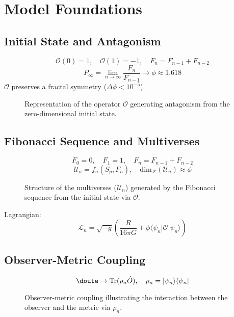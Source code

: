 \documentclass[aps,prl,twocolumn,groupedaddress]{revtex4-2}
\newcommand{\F}[1]{F_{#1}}
\newcommand{\U}[1]{\mathcal{U}_{#1}}
\newcommand{\phiapprox}{\phi \approx 1.618}
\newcommand{\Opp}{\mathcal{O}}
\newcommand{\dimfrac}{\mathrm{dim}_\mathscr{F}}
\begin{document}
\section{Model Foundations}
\subsection{Initial State and Antagonism}
\begin{equation}
\Opp(0) = 1, \quad \Opp(1) = -1, \quad \F{n} = \F{n-1} + \F{n-2}
\label{eq:antagonism}
\end{equation}
\begin{equation}
P_\infty = \lim_{n \to \infty} \frac{\F{n}}{\F{n-1}} \to \phiapprox
\label{eq:paradox}
\end{equation}
\(\Opp\) preserves a fractal symmetry (\(\Delta \phi < 10^{-5}\)).
\begin{figure}
\centering

\caption{Representation of the operator \(\Opp\) generating antagonism from the zero-dimensional initial state.}
\label{fig:opp}
\end{figure}

\subsection{Fibonacci Sequence and Multiverses}
\begin{equation}
\F{0} = 0, \quad \F{1} = 1, \quad \F{n} = \F{n-1} + \F{n-2}
\label{eq:fibonacci}
\end{equation}
\begin{equation}
\U{n} = f_n(S_p, \F{n}), \quad \dimfrac(\U{n}) \approx \phi
\label{eq:univers}
\end{equation}
\begin{figure}
\centering

\caption{Structure of the multiverses (\(\U{n}\)) generated by the Fibonacci sequence from the initial state via \(\Opp\).}
\label{fig:fibonacci}
\end{figure}
Lagrangian:
\begin{equation}
\mathcal{L}_n = \sqrt{-g} \left( \frac{R}{16\pi G} + \phi \langle \psi_n | \Opp | \psi_n \rangle \right)
\label{eq:lagrangian}
\end{equation}

\subsection{Observer-Metric Coupling}
\begin{equation}
\doute \to \text{Tr}(\rho_n \hat{O}), \quad \rho_n = |\psi_n\rangle\langle\psi_n|
\label{eq:doute}
\end{equation}
\begin{figure}
\centering

\caption{Observer-metric coupling illustrating the interaction between the observer and the metric via \(\rho_n\).}
\label{fig:coupling}
\end{figure}
\end{document}
